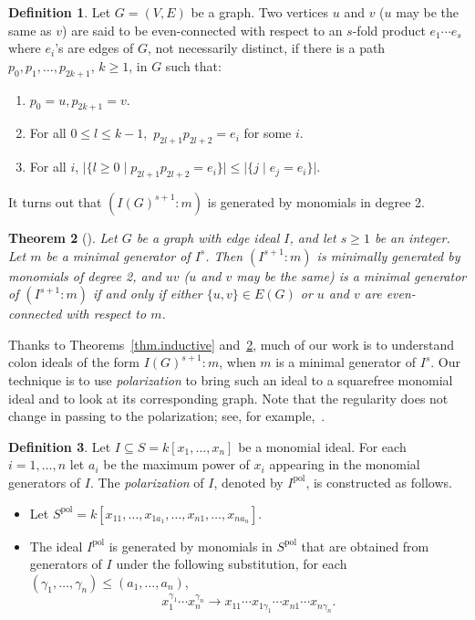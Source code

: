 \documentclass[10pt]{amsart}
\newtheorem{theo}{Theorem}[section]
\theoremstyle{definition}
\newtheorem{defi}[theo]{Definition}
\DeclareMathOperator{\pol}{pol}
\begin{document}
\begin{defi}\label{even_connected} Let $G=(V,E)$ be a graph. Two vertices $u$ and $v$ ($u$ may be the same as $v$) are
said to be even-connected with respect to an $s$-fold product $e_1\cdots e_s$ where $e_i$'s are edges of $G$, not necessarily distinct,
if there is a path $p_0,p_1,\ldots, p_{2k+1}$, $k\geq 1$, in $G$ such that:
\begin{enumerate}
 \item\label{def2.15_1} $p_0=u,p_{2k+1}=v.$
 \item\label{def2.15_2} For all $0 \leq l \leq k-1,$ $p_{2l+1}p_{2l+2}=e_i$ for some $i$.
 \item\label{def2.15_3} For all $i$, $\big|\{l \geq 0 \mid p_{2l+1}p_{2l+2}=e_i \}\big| \le \big|\{j \mid e_j=e_i\}\big|$.
\end{enumerate}
\end{defi}

It turns out that $(I(G)^{s+1} : m)$ is generated by monomials in degree 2.

\begin{theo}[] \label{even_connec_equivalent}
Let $G$ be a graph with edge ideal
$I$, and let $s \geq 1$ be an integer. Let $m$ be a minimal generator of $I^s$.
Then $(I^{s+1} : m)$ is minimally generated by monomials of degree 2, and $uv$ ($u$ and $v$ may
be the same) is a minimal generator of $(I^{s+1} : m )$ if and only if either $\{u, v\} \in E(G) $ or $u$ and $v$ are even-connected with respect to $m$.
 \end{theo}

Thanks to Theorems~\ref{thm.inductive} and~\ref{even_connec_equivalent}, much of our work is to understand colon ideals of the form $I(G)^{s+1}:m$, when $m$ is a minimal generator of $I^s$. Our technique is to use \emph{polarization} to bring such an ideal to a squarefree monomial ideal and to look at its corresponding graph. Note that the regularity does not change in passing to the polarization; see, for example,~\cite[Corollary 1.6.3]{HH}.

\begin{defi}\label{def.polarization}
Let $I \subseteq S = k[x_1, \ldots, x_n]$ be a monomial ideal.
For each $i = 1, \ldots, n$ let $a_i$ be the maximum power of $x_i$ appearing in the monomial generators of $I$. The \emph{polarization} of $I$, denoted by $I^{\pol}$, is constructed as follows.
\begin{itemize}
\item Let $S^{\pol} = k[x_{11}, \ldots, x_{1a_1}, \ldots, x_{n1}, \ldots, x_{na_n}]$.
\item The ideal $I^{\pol}$ is generated by monomials in $S^{\pol}$ that are obtained from generators of $I$ under the following substitution, for each $(\gamma_1, \ldots, \gamma_n) \le (a_1, \dots, a_n)$,
\[
x_1^{\gamma_1} \cdots x_n^{\gamma_n} \longrightarrow x_{11} \cdots x_{1\gamma_1} \cdots x_{n1} \cdots x_{n\gamma_n}.
\]

\end{itemize}
\end{defi}
\end{document}
